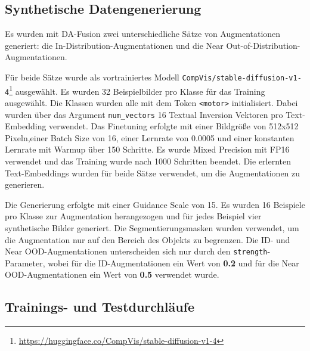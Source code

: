 \subsection{Synthetische Datengenerierung} \label{subsec:da-fusion-setup}

Es wurden mit DA-Fusion zwei unterschiedliche Sätze von Augmentationen generiert: die In-Distribution-Augmentationen und die Near Out-of-Distribution-Augmentationen.

Für beide Sätze wurde als vortrainiertes Modell \lstinline{CompVis/stable-diffusion-v1-4}\footnote{\url{https://huggingface.co/CompVis/stable-diffusion-v1-4}} ausgewählt. Es wurden 32 Beispielbilder pro Klasse für das Training ausgewählt. Die Klassen wurden alle mit dem Token \lstinline{<motor>} initialisiert. Dabei wurden über das Argument \lstinline{num_vectors} 16 Textual Inversion Vektoren pro Text-Embedding verwendet. Das Finetuning erfolgte mit einer Bildgröße von 512x512 Pixeln,einer Batch Size von 16, einer Lernrate von 0.0005 und einer konstanten Lernrate mit Warmup über 150 Schritte. Es wurde Mixed Precision mit FP16 verwendet und das Training wurde nach 1000 Schritten beendet. Die erlernten Text-Embeddings wurden für beide Sätze verwendet, um die Augmentationen zu generieren.

Die Generierung erfolgte mit einer Guidance Scale von 15. Es wurden 16 Beispiele pro Klasse zur Augmentation herangezogen und für jedes Beispiel vier synthetische Bilder generiert. Die Segmentierungsmasken wurden verwendet, um die Augmentation nur auf den Bereich des Objekts zu begrenzen. Die ID- und Near OOD-Augmentationen unterscheiden sich nur durch den \lstinline{strength}-Parameter, wobei für die ID-Augmentationen ein Wert von \textbf{0.2} und für die Near OOD-Augmentationen ein Wert von \textbf{0.5} verwendet wurde.

\subsection{Trainings- und Testdurchläufe} \label{subsec:supcon-setup}

